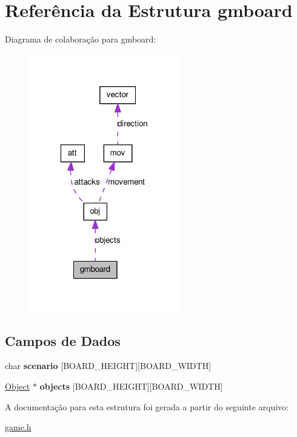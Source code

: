 \hypertarget{structgmboard}{
\section{Referência da Estrutura gmboard}
\label{structgmboard}
}


Diagrama de colaboração para gmboard:\nopagebreak
\begin{figure}[H]
\begin{center}
\leavevmode
\includegraphics[width=187pt]{structgmboard__coll__graph}
\end{center}
\end{figure}
\subsection*{Campos de Dados}
\begin{DoxyCompactItemize}
\item 
\hypertarget{structgmboard_ac93f4d34cf045e33f4ef3b0852758a6f}{
char {\bfseries scenario} \mbox{[}BOARD\_\-HEIGHT\mbox{]}\mbox{[}BOARD\_\-WIDTH\mbox{]}}
\label{structgmboard_ac93f4d34cf045e33f4ef3b0852758a6f}

\item 
\hypertarget{structgmboard_a329a8c751b484ac4562b5334174cd9b5}{
\hyperlink{structobj}{Object} $\ast$ {\bfseries objects} \mbox{[}BOARD\_\-HEIGHT\mbox{]}\mbox{[}BOARD\_\-WIDTH\mbox{]}}
\label{structgmboard_a329a8c751b484ac4562b5334174cd9b5}

\end{DoxyCompactItemize}


A documentação para esta estrutura foi gerada a partir do seguinte arquivo:\begin{DoxyCompactItemize}
\item 
\hyperlink{game_8h}{game.h}\end{DoxyCompactItemize}
